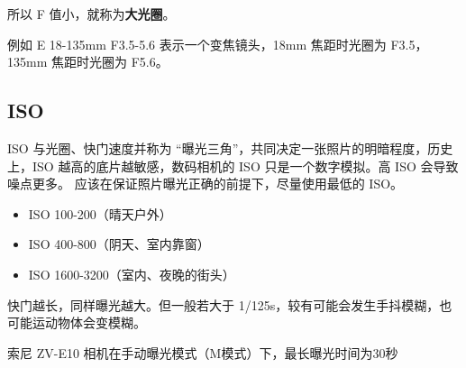 所以 F 值小，就称为\textbf{大光圈}。

例如 E 18-135mm F3.5-5.6 表示一个变焦镜头，18mm 焦距时光圈为 F3.5， 135mm 焦距时光圈为 F5.6。

\subsection{ISO}
ISO 与光圈、快门速度并称为 “曝光三角”，共同决定一张照片的明暗程度，历史上，ISO 越高的底片越敏感，数码相机的 ISO 只是一个数字模拟。高 ISO 会导致噪点更多。 应该在保证照片曝光正确的前提下，尽量使用最低的 ISO。
\begin{itemize}
\item ISO 100-200（晴天户外）
\item ISO 400-800（阴天、室内靠窗）
\item ISO 1600-3200（室内、夜晚的街头）
\end{itemize}
快门越长，同样曝光越大。但一般若大于 1/125s，较有可能会发生手抖模糊，也可能运动物体会变模糊。


索尼 ZV-E10 相机在手动曝光模式（M模式）下，最长曝光时间为30秒